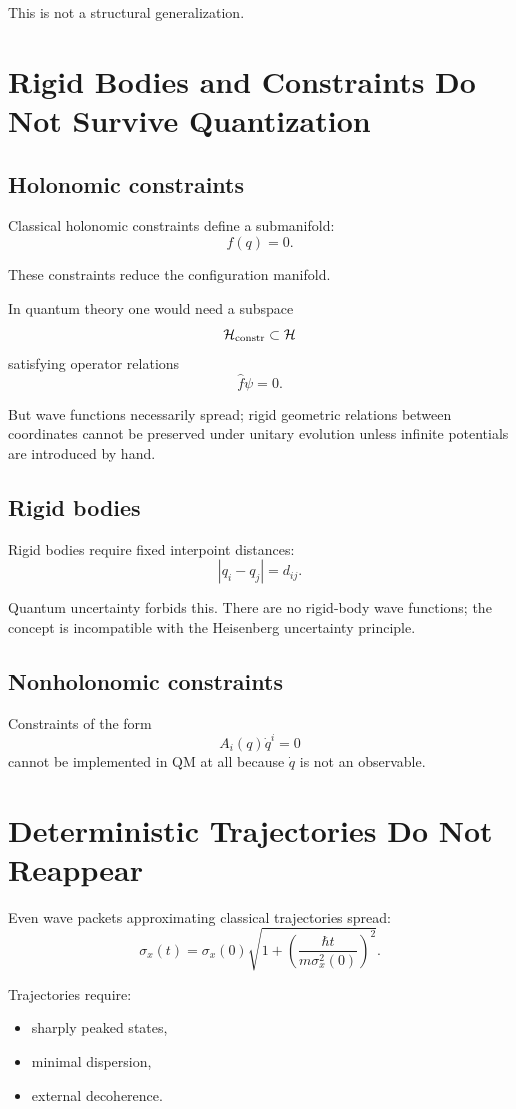 \documentclass[12pt]{article}
\begin{document}
This is not a structural generalization.

\section{Rigid Bodies and Constraints Do Not Survive Quantization}

\subsection{Holonomic constraints}

Classical holonomic constraints define a submanifold:
\[
f(q)=0.
\]

These constraints reduce the configuration manifold.

In quantum theory one would need a subspace
\[
\mathcal{H}_{\rm constr} \subset \mathcal{H}
\]
satisfying operator relations
\[
\hat f \psi = 0.
\]

But wave functions necessarily spread; rigid geometric relations between coordinates cannot be preserved under unitary evolution unless infinite potentials are introduced by hand.

\subsection{Rigid bodies}

Rigid bodies require fixed interpoint distances:
\[
|q_i - q_j| = d_{ij}.
\]

Quantum uncertainty forbids this. There are no rigid-body wave functions; the concept is incompatible with the Heisenberg uncertainty principle.

\subsection{Nonholonomic constraints}

Constraints of the form
\[
A_i(q)\dot{q}^i = 0
\]
cannot be implemented in QM at all because $\dot{q}$ is not an observable.

\section{Deterministic Trajectories Do Not Reappear}

Even wave packets approximating classical trajectories spread:
\[
\sigma_x(t) = \sigma_x(0) \sqrt{1 + \left(\frac{\hbar t}{m \sigma_x^2(0)}\right)^2}.
\]

Trajectories require:
\begin{itemize}
    \item sharply peaked states,
    \item minimal dispersion,
    \item external decoherence.
\end{itemize}
\end{document}
